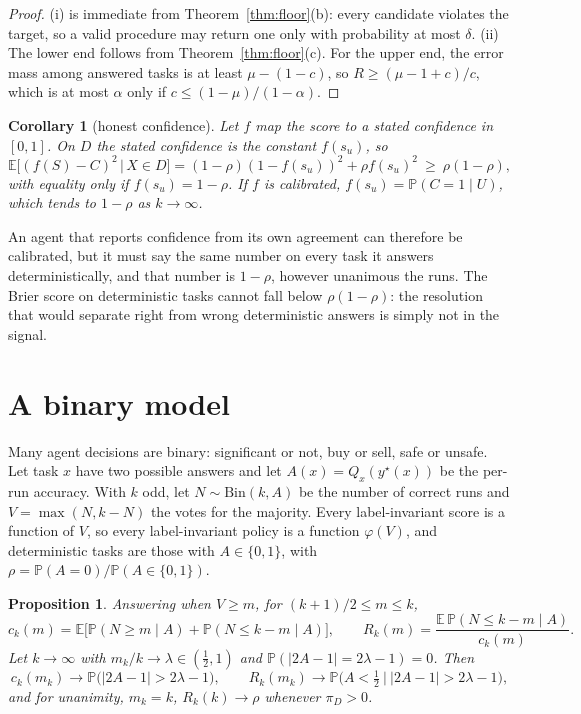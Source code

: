\documentclass[11pt]{article}
\newtheorem{proposition}{Proposition}
\newtheorem{corollary}{Corollary}
\theoremstyle{definition}
\newcommand{\E}{\mathbb{E}}
\renewcommand{\P}{\mathbb{P}}
\begin{document}
\begin{proof}
(i) is immediate from Theorem~\ref{thm:floor}(b): every candidate violates the target, so a
valid procedure may return one only with probability at most $\delta$. (ii) The lower end follows
from Theorem~\ref{thm:floor}(c). For the upper end, the error mass among answered tasks is at least
$\mu-(1-c)$, so $R\ge(\mu-1+c)/c$, which is at most $\alpha$ only if $c\le(1-\mu)/(1-\alpha)$.
\end{proof}

\begin{corollary}[honest confidence]\label{cor:conf}
Let $f$ map the score to a stated confidence in $[0,1]$. On $D$ the stated confidence is the
constant $f(s_u)$, so
\[
\E\big[(f(S)-C)^2\,\big|\,X\in D\big]=(1-\rho)(1-f(s_u))^2+\rho f(s_u)^2\ \ge\ \rho(1-\rho),
\]
with equality only if $f(s_u)=1-\rho$. If $f$ is calibrated, $f(s_u)=\P(C=1\mid U)$, which tends to
$1-\rho$ as $k\to\infty$.
\end{corollary}

An agent that reports confidence from its own agreement can therefore be calibrated, but it must
say the same number on every task it answers deterministically, and that number is $1-\rho$,
however unanimous the runs. The Brier score on deterministic tasks cannot fall below
$\rho(1-\rho)$: the resolution that would separate right from wrong deterministic answers is
simply not in the signal.

\section{A binary model}\label{sec:binary}

Many agent decisions are binary: significant or not, buy or sell, safe or unsafe. Let task $x$ have
two possible answers and let $A(x)=Q_x(y^\star(x))$ be the per-run accuracy. With $k$ odd, let
$N\sim\mathrm{Bin}(k,A)$ be the number of correct runs and $V=\max(N,k-N)$ the votes for the majority.
Every label-invariant score is a function of $V$, so every label-invariant policy is a function
$\varphi(V)$, and deterministic tasks are those with $A\in\{0,1\}$, with
$\rho=\P(A=0)/\P(A\in\{0,1\})$.

\begin{proposition}\label{prop:binary}
Answering when $V\ge m$, for $(k+1)/2\le m\le k$,
\[
c_k(m)=\E\big[\P(N\ge m\mid A)+\P(N\le k-m\mid A)\big],\qquad
R_k(m)=\frac{\E\,\P(N\le k-m\mid A)}{c_k(m)}.
\]
Let $k\to\infty$ with $m_k/k\to\lambda\in(\tfrac12,1)$ and $\P(|2A-1|=2\lambda-1)=0$. Then
\[
c_k(m_k)\to\P\big(|2A-1|>2\lambda-1\big),\qquad
R_k(m_k)\to\P\big(A<\tfrac12\ \big|\ |2A-1|>2\lambda-1\big),
\]
and for unanimity, $m_k=k$, $R_k(k)\to\rho$ whenever $\pi_D>0$.
\end{proposition}
\end{document}
